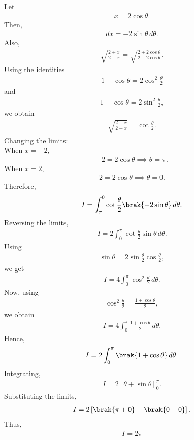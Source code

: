 \begin{enumerate}[label=\thesubsection.\arabic*, ref=\thesubsection.\theenumi]
\solution
Let
\begin{align}
x=2\cos\theta.
\end{align}
Then,
\begin{align}
dx=-2\sin\theta\,d\theta.
\end{align}
Also,
\begin{align}
\sqrt{\frac{2+x}{2-x}}
=\sqrt{\frac{2+2\cos\theta}{2-2\cos\theta}}.
\end{align}
Using the identities
\begin{align}
1+\cos\theta=2\cos^2\frac{\theta}{2}
\end{align}
and
\begin{align}
1-\cos\theta=2\sin^2\frac{\theta}{2},
\end{align}
we obtain
\begin{align}
\sqrt{\frac{2+x}{2-x}}
=\cot\frac{\theta}{2}.
\end{align}
{Changing the limits:}
\\When $x=-2$,
\begin{align}
-2=2\cos\theta
\implies \theta=\pi.
\end{align}
When $x=2$,
\begin{align}
2=2\cos\theta
\implies \theta=0.
\end{align}
Therefore,
\begin{align}
I=\int_{\pi}^{0}
\cot\frac{\theta}{2}\brak{-2\sin\theta}\,d\theta.
\end{align}
Reversing the limits,
\begin{align}
I=2\int_0^\pi
\cot\frac{\theta}{2}\sin\theta\,d\theta.
\end{align}
Using
\begin{align}
\sin\theta
=2\sin\frac{\theta}{2}\cos\frac{\theta}{2},
\end{align}
we get
\begin{align}
I=4\int_0^\pi
\cos^2\frac{\theta}{2}\,d\theta.
\end{align}
Now, using
\begin{align}
\cos^2\frac{\theta}{2}
=\frac{1+\cos\theta}{2},
\end{align}
we obtain
\begin{align}
I=4\int_0^\pi\frac{1+\cos\theta}{2}\,d\theta.
\end{align}
Hence,
\begin{align}
I=2\int_0^\pi\brak{1+\cos\theta}\,d\theta.
\end{align}
Integrating,
\begin{align}
I=2\left[\theta+\sin\theta\right]_0^\pi.
\end{align}
Substituting the limits,
\begin{align}
I=2\left[\brak{\pi+0}-\brak{0+0}\right].
\end{align}
Thus,
\begin{align}
I=2\pi
\end{align}


\end{enumerate}
